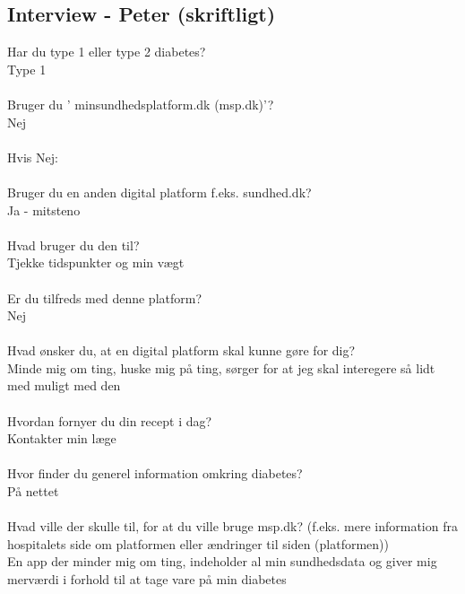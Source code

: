 \subsection{Interview - Peter (skriftligt)}
Har du type 1 eller type 2 diabetes?\\
Type 1
\\ \\
Bruger  du ’ minsundhedsplatform.dk (msp.dk)’?\\
Nej
\\ \\
Hvis Nej:
\\ \\
Bruger du en anden digital platform f.eks. sundhed.dk?\\
Ja - mitsteno
\\ \\
Hvad bruger du den til?\\
Tjekke tidspunkter og min vægt
\\ \\
Er du tilfreds med denne platform?\\
Nej
\\ \\
Hvad ønsker du, at en digital platform skal kunne gøre for dig?\\
Minde mig om ting, huske mig på ting, sørger for at jeg skal interegere så lidt med muligt med den
\\ \\
Hvordan fornyer du din recept i dag?\\
Kontakter min læge
\\ \\
Hvor finder du generel information omkring diabetes?\\
På nettet
\\ \\
Hvad ville der skulle til, for at du ville bruge msp.dk? (f.eks. mere information fra hospitalets side om platformen eller ændringer til siden (platformen))\\
En app der minder mig om ting, indeholder al min sundhedsdata og giver mig merværdi i forhold til at tage vare på min diabetes